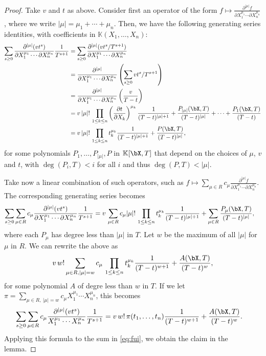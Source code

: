 \documentclass[12pt]{article}
\def\K {\ensuremath{\mathbb{K}}}
\def\K{\mathbb{K}}
\begin{document}
\begin{proof}
	Take $v$ and $t$ as above. Consider first
	an operator of the form $f \mapsto \frac{ \partial^{|\mu|}  f}
	{\partial X_1^{\mu_1} \cdots \partial X_n^{\mu_n}}$, where 
	we write $|\mu|=\mu_1+\cdots+\mu_n$. Then, we have
	the following generating series identities, with coefficients in 
	$\K(X_1,\dots,X_n)$:
	\begin{align*}
	\sum_{s \ge 0} 
	\frac{ \partial^{|\mu|} ( v t^s )} {\partial X_1^{\mu_1} \cdots
		\partial X_n^{\mu_n}}
	\frac{1}{T^{s+1}} 
	&=  \sum_{s \ge 0} 
	\frac{ \partial^{|\mu|} (v t^s/T^{s+1})} {\partial X_1^{\mu_1} \cdots
		\partial X_n^{\mu_n}}\\
	&=  
	\frac{ \partial^{|\mu|} } {\partial X_1^{\mu_1} \cdots
		\partial X_n^{\mu_n}}
	\left (\sum_{s \ge 0} v t^s/T^{s+1}\right ) \\
	&= \frac{ \partial^{|\mu|} } {\partial X_1^{\mu_1} \cdots
		\partial X_n^{\mu_n}}
	\left (\frac v{T-t} \right ) \\
	&= v\, |\mu|!\, \prod_{1 \le k \le n} 
	\left (\frac{ \partial t} {\partial X_k} \right)^{\mu_k}
	\frac {1}{(T-t)^{|\mu|+1}} + \frac{P_{|\mu|}(\bX,T)}{(T-t)^{|\mu|}} + \cdots + \frac{P_{1}(\bX,T)}{(T-t)}\\
	&= v\, |\mu|!\, \prod_{1 \le k \le n} 
	t_k^{\mu_k}
	\frac {1}{(T-t)^{|\mu|+1}} + \frac{P(\bX,T)}{(T-t)^{|\mu|}},
	\end{align*}
	for some polynomials $P_1,\dots,P_{|\mu|},P$ in $\K[\bX,T]$ that
	depend on the choices of $\mu$, $v$ and $t$, with $\deg(P_i,T) < i$
	for all $i$ and thus $\deg(P,T) < |\mu|$.
	
	Take now a linear combination of such operators, such as 
	$f \mapsto \sum_{\mu \in R} c_\mu \frac{ \partial^{|\mu|}  f } {\partial X_1^{\mu_1} \cdots
		\partial X_n^{\mu_n}}$. The corresponding generating series
	becomes
	\begin{align*}
	\sum_{s \ge 0} 
	\sum_{\mu \in R} c_\mu \frac{ \partial^{|\mu|} ( v t^s )} {\partial X_1^{\mu_1} \cdots
		\partial X_n^{\mu_n}}
	\frac{1}{T^{s+1}}
	&=
	v\,\sum_{\mu \in R} c_\mu
	|\mu|!\, \prod_{1 \le k \le n} 
	t_k^{\mu_k}
	\frac {1}{(T-t )^{|\mu|+1}} +\sum_{\mu \in R} \frac{P_\mu(\bX,T)}{(T-t)^{|\mu|}},
	\end{align*}
	where each $P_\mu$ has degree less than $|\mu|$ in $T$.
	Let $w$ be the maximum of all $|\mu|$ for $\mu$ in $R$. We can rewrite 
	the above as
	\begin{align*}
	v\, w! 
	\sum_{\mu \in R, |\mu|=w} c_\mu
	\, \prod_{1 \le k \le n} 
	t_k^{\mu_k}
	\frac {1}{(T-t )^{w+1}}
	+ \frac{A(\bX,T)}{(T-t )^{w}},
	\end{align*}
	for some polynomial $A$ of degre less than $w$ in $T$. If we let 
	$\pi =\sum_{\mu \in R,\ |\mu|=w} c_{\mu} X_1^{\mu_1} \cdots
	X_n^{\mu_n}$, this becomes
	\begin{align*}
	\sum_{s \ge 0} 
	\sum_{\mu \in R} c_\mu \frac{ \partial^{|\mu|} ( v t^s )} { X_1^{\mu_1} \cdots
		X_n^{\mu_n}}
	\frac{1}{T^{s+1}} 
	&=
	v\, w! \,  \pi(t_1,\dots,t_n)
	\frac {1}{(T-t )^{w+1}}
	+ \frac{A(\bX,T)}{(T-t )^{w}}.
	\end{align*}
	Applying this formula to the sum in \cref{eq:fui}, we obtain the
	claim in the lemma.
\end{proof}
\end{document}
